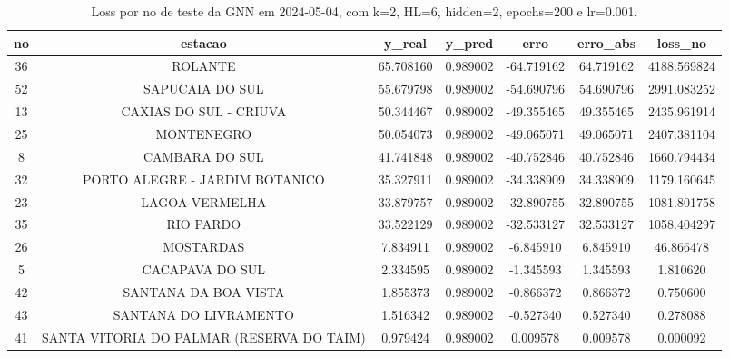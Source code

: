 \begin{table}[h]
\centering
\caption{Loss por no de teste da GNN em 2024-05-04, com k=2, HL=6, hidden=2, epochs=200 e lr=0.001.}
\label{tab:gnn_loss_k2_hl6_h2_e200_d20240504}
\begin{tabular}{ccccccc}
\toprule
no & estacao & y\_real & y\_pred & erro & erro\_abs & loss\_no \\
\midrule
36 & ROLANTE & 65.708160 & 0.989002 & -64.719162 & 64.719162 & 4188.569824 \\
52 & SAPUCAIA DO SUL & 55.679798 & 0.989002 & -54.690796 & 54.690796 & 2991.083252 \\
13 & CAXIAS DO SUL - CRIUVA & 50.344467 & 0.989002 & -49.355465 & 49.355465 & 2435.961914 \\
25 & MONTENEGRO & 50.054073 & 0.989002 & -49.065071 & 49.065071 & 2407.381104 \\
8 & CAMBARA DO SUL & 41.741848 & 0.989002 & -40.752846 & 40.752846 & 1660.794434 \\
32 & PORTO ALEGRE - JARDIM BOTANICO & 35.327911 & 0.989002 & -34.338909 & 34.338909 & 1179.160645 \\
23 & LAGOA VERMELHA & 33.879757 & 0.989002 & -32.890755 & 32.890755 & 1081.801758 \\
35 & RIO PARDO & 33.522129 & 0.989002 & -32.533127 & 32.533127 & 1058.404297 \\
26 & MOSTARDAS & 7.834911 & 0.989002 & -6.845910 & 6.845910 & 46.866478 \\
5 & CACAPAVA DO SUL & 2.334595 & 0.989002 & -1.345593 & 1.345593 & 1.810620 \\
42 & SANTANA DA BOA VISTA & 1.855373 & 0.989002 & -0.866372 & 0.866372 & 0.750600 \\
43 & SANTANA DO LIVRAMENTO & 1.516342 & 0.989002 & -0.527340 & 0.527340 & 0.278088 \\
41 & SANTA VITORIA DO PALMAR (RESERVA DO TAIM) & 0.979424 & 0.989002 & 0.009578 & 0.009578 & 0.000092 \\
\bottomrule
\end{tabular}
\end{table}
